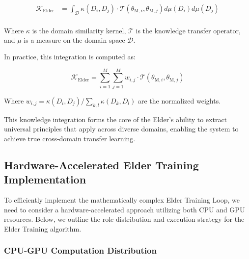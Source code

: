 \begin{equation}
\begin{aligned}
\mathcal{K}_{\text{Elder}} &= \int_{\mathcal{D}} \kappa(D_i, D_j) \cdot \mathcal{T}(\theta_{\text{M},i}, \theta_{\text{M},j}) d\mu(D_i) d\mu(D_j) \\
\end{aligned}
\end{equation}

Where $\kappa$ is the domain similarity kernel, $\mathcal{T}$ is the knowledge transfer operator, and $\mu$ is a measure on the domain space $\mathcal{D}$.

In practice, this integration is computed as:

\begin{equation}
\mathcal{K}_{\text{Elder}} = \sum_{i=1}^M \sum_{j=1}^M w_{i,j} \cdot \mathcal{T}(\theta_{\text{M},i}, \theta_{\text{M},j})
\end{equation}

Where $w_{i,j} = \kappa(D_i, D_j) / \sum_{k,l} \kappa(D_k, D_l)$ are the normalized weights.

This knowledge integration forms the core of the Elder's ability to extract universal principles that apply across diverse domains, enabling the system to achieve true cross-domain transfer learning.

\subsection{Hardware-Accelerated Elder Training Implementation}

To efficiently implement the mathematically complex Elder Training Loop, we need to consider a hardware-accelerated approach utilizing both CPU and GPU resources. Below, we outline the role distribution and execution strategy for the Elder Training algorithm.

\subsubsection{CPU-GPU Computation Distribution}

